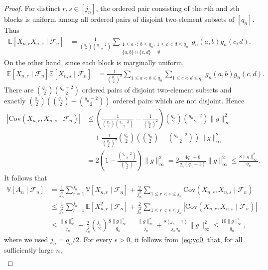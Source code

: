 \documentclass[english,11pt]{smfart}
\newcommand{\Exb}[1]{\mathbb{E}\left[#1\right]}
\newcommand{\Vab}[1]{\mathbb{V}\left[#1\right]}
\newcommand{\cF}{\mathcal{F}}
\newcommand{\Cov}{\mathrm{Cov}}
\numberwithin{equation}{section}
\begin{document}
\begin{proof}
	For distinct $r,s\in[j_n]$, the ordered pair consisting of the $r$th and $s$th blocks is uniform among all ordered pairs of disjoint two-element subsets of $[q_n]$. Thus
		\begin{align*}
			\Exb{X_{n,r}X_{n,s}\mid\cF_n}
			&=
			\frac{1}{
				\binom{q_n}{2}\binom{q_n-2}{2}
			}
			\sum_{\substack{
					1\le a<b\le q_n,\;1\le c<d\le q_n\\
					\{a,b\}\cap\{c,d\}=\emptyset
			}}
			g_n(a,b)g_n(c,d).
		\end{align*}
		On the other hand, since each block is marginally uniform,
		\begin{align*}
			\Exb{X_{n,r}\mid\cF_n}\Exb{X_{n,s}\mid\cF_n} &= \frac{1}{\binom{q_n}{2}^2} \sum_{1\le a<b\le q_n} \sum_{1\le c<d\le q_n} g_n(a,b)g_n(c,d).
		\end{align*}
		There are
		$
			\binom{q_n}{2}\binom{q_n-2}{2}
		$
		ordered pairs of disjoint two-element subsets and exactly
		$
			\binom{q_n}{2} \left( \binom{q_n}{2}-\binom{q_n-2}{2}\right)
		$
		ordered pairs which are not disjoint. Hence
		\begin{align*}
			\left|\Cov(X_{n,r},X_{n,s}\mid\cF_n)\right| &\le \left( \frac{1}{ \binom{q_n}{2}\binom{q_n-2}{2}} - \frac{1}{\binom{q_n}{2}^2} \right) \binom{q_n}{2}\binom{q_n-2}{2} \|g\|_\infty^2\\
			&\quad+
			\frac{1}{\binom{q_n}{2}^2} \binom{q_n}{2} \left(\binom{q_n}{2}-\binom{q_n-2}{2}\right) \|g\|_\infty^2\\
			&= 2\left(1-\frac{\binom{q_n-2}{2}}{\binom{q_n}{2}}\right)\|g\|_\infty^2 =2\frac{4q_n-6}{q_n(q_n-1)}\|g\|_\infty^2 \le\frac{8\|g\|_\infty^2}{q_n}.
		\end{align*}
		It follows that
		\begin{align*}
			\Vab{A_n\mid\cF_n} &= \frac{1}{j_n^2} \sum_{r=1}^{j_n}\Vab{X_{n,r}\mid\cF_n} + \frac{2}{j_n^2} \sum_{1\le r<s\le j_n} \Cov(X_{n,r},X_{n,s}\mid\cF_n)\\
			&\le \frac{1}{j_n^2} \sum_{r=1}^{j_n}\Exb{X_{n,r}^2\mid\cF_n} + \frac{2}{j_n^2} \sum_{1\le r<s\le j_n} \left|\Cov(X_{n,r},X_{n,s}\mid\cF_n)\right|\\
			&\le \frac{\|g\|_\infty^2}{j_n} + \frac{2}{j_n^2}\binom{j_n}{2} \frac{8\|g\|_\infty^2}{q_n} = \frac{\|g\|_\infty^2}{j_n} + \frac{8(j_n-1)}{j_nq_n}\|g\|_\infty^2 \le \frac{10\|g\|_\infty^2}{q_n},
		\end{align*}
		where we used $j_n = q_n/2$. For every $\epsilon>0$, it follows from~\eqref{eq:yo0} that, for all sufficiently large $n$,
		\begin{align*}

\end{align*}
\end{proof}
\end{document}
